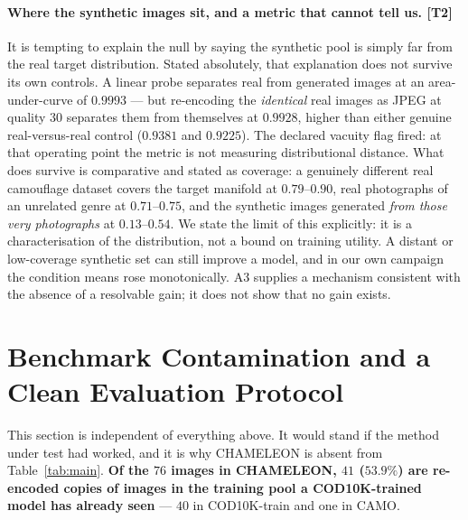 \documentclass{article}
\begin{document}
\paragraph{Where the synthetic images sit, and a metric that cannot tell us. \textnormal{[T2]}}
It is tempting to explain the null by saying the synthetic pool is simply far
from the real target distribution. Stated absolutely, that explanation does not
survive its own controls. A linear probe separates real from generated images at
an area-under-curve of $0.9993$ --- but re-encoding the \emph{identical} real
images as JPEG at quality $30$ separates them from themselves at $0.9928$,
higher than either genuine real-versus-real control ($0.9381$ and $0.9225$).
The declared vacuity flag fired: at that operating point the metric is not
measuring distributional distance.
What does survive is comparative and stated as coverage: a genuinely different
real camouflage dataset covers the target manifold at $0.79$--$0.90$, real
photographs of an unrelated genre at $0.71$--$0.75$, and the synthetic images
generated \emph{from those very photographs} at $0.13$--$0.54$.
We state the limit of this explicitly: it is a characterisation of the
distribution, not a bound on training utility. A distant or low-coverage
synthetic set can still improve a model, and in our own campaign the condition
means rose monotonically. A3 supplies a mechanism consistent with the absence of
a resolvable gain; it does not show that no gain exists.

\section{Benchmark Contamination and a Clean Evaluation Protocol}
\label{sec:contamination}

This section is independent of everything above. It would stand if the method
under test had worked, and it is why CHAMELEON is absent from
Table~\ref{tab:main}. \textbf{Of the $76$ images in CHAMELEON, $41$
($53.9\%$) are re-encoded copies of images in the training pool a
COD10K-trained model has already seen} --- $40$ in COD10K-train and one in CAMO.
\end{document}
